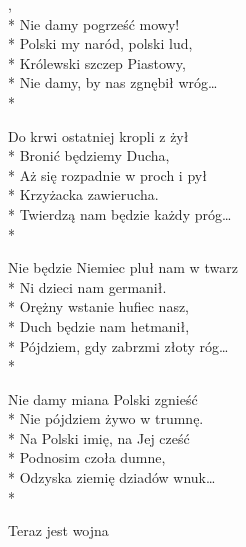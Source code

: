 \begin{lyrics}[longestline={Nie będzie Niemiec pluł nam w twarz}]

,\\*
Nie damy pogrześć mowy!\\*
Polski my naród, polski lud,\\*
Królewski szczep Piastowy,\\*
Nie damy, by nas zgnębił wróg\ldots\\*

Do krwi ostatniej kropli z żył\\*
Bronić będziemy Ducha,\\*
Aż się rozpadnie w proch i pył\\*
Krzyżacka zawierucha.\\*
Twierdzą nam będzie każdy próg\ldots\\*

Nie będzie Niemiec pluł nam w twarz\\*
Ni dzieci nam germanił.\\*
Orężny wstanie hufiec nasz,\\*
Duch będzie nam hetmanił,\\*
Pójdziem, gdy zabrzmi złoty róg\ldots\\*

Nie damy miana Polski zgnieść\\*
Nie pójdziem żywo w trumnę.\\*
Na Polski imię, na Jej cześć\\*
Podnosim czoła dumne,\\*
Odzyska ziemię dziadów wnuk\ldots\\*
\end{lyrics}



\song
{Teraz jest wojna}

